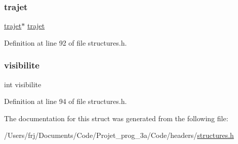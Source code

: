 \hypertarget{structbdd__trace_ad417eb03de659793c712421b340fbec4}{}\label{structbdd__trace_ad417eb03de659793c712421b340fbec4} 
\subsubsection{\texorpdfstring{trajet}{trajet}}
{\footnotesize\ttfamily \hyperlink{structtrajet}{trajet}$\ast$ \hyperlink{structtrajet}{trajet}}



Definition at line 92 of file structures.\+h.

\hypertarget{structbdd__trace_aa34b47a3ed3a7dfed8a672132bcc3f2a}{}\label{structbdd__trace_aa34b47a3ed3a7dfed8a672132bcc3f2a} 
\subsubsection{\texorpdfstring{visibilite}{visibilite}}
{\footnotesize\ttfamily int visibilite}



Definition at line 94 of file structures.\+h.



The documentation for this struct was generated from the following file\+:\begin{DoxyCompactItemize}
\item 
/\+Users/frj/\+Documents/\+Code/\+Projet\+\_\+prog\+\_\+3a/\+Code/headers/\hyperlink{structures_8h}{structures.\+h}\end{DoxyCompactItemize}
